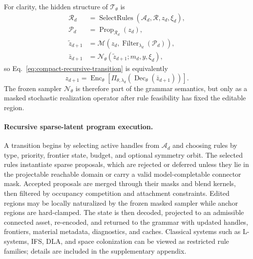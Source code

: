 \documentclass[sigconf,anonymous,review]{acmart}
\begin{document}
For clarity, the hidden structure of $\mathcal T_{\theta}$ is
\begin{align}
\mathcal R_d&=\operatorname{SelectRules}(\mathcal A_d,\mathcal R,z_d,\xi_d),\\
\mathcal P_d&=\operatorname{Prop}_{\mathcal R_d}(z_d),\\
\tilde z_{d+1}&=\mathcal M(z_d,\operatorname{Filter}_{\lambda_d}(\mathcal P_d)),\\
\bar z_{d+1}&=\mathcal N_{\theta}(\tilde z_{d+1};m_d,y,\xi_d),
\end{align}
so Eq.~\eqref{eq:compact-recursive-transition} is equivalently
\begin{equation}
z_{d+1}=
\operatorname{Enc}_{\theta}
\!\left[
\Pi_{\theta,\lambda_d}
\!\left(
\operatorname{Dec}_{\theta}(\bar z_{d+1})
\right)
\right].
\end{equation}
The frozen sampler $\mathcal N_{\theta}$ is therefore part of the grammar semantics, but only as a masked stochastic realization operator after rule feasibility has fixed the editable region.

\paragraph{Recursive sparse-latent program execution.}
A transition begins by selecting active handles from $\mathcal A_d$ and choosing rules by type, priority, frontier state, budget, and optional symmetry orbit. The selected rules instantiate sparse proposals, which are rejected or deferred unless they lie in the projectable reachable domain or carry a valid model-completable connector mask. Accepted proposals are merged through their masks and blend kernels, then filtered by occupancy competition and attachment constraints. Edited regions may be locally naturalized by the frozen masked sampler while anchor regions are hard-clamped. The state is then decoded, projected to an admissible connected asset, re-encoded, and returned to the grammar with updated handles, frontiers, material metadata, diagnostics, and caches. Classical systems such as L-systems, IFS, DLA, and space colonization can be viewed as restricted rule families; details are included in the supplementary appendix.
\end{document}
